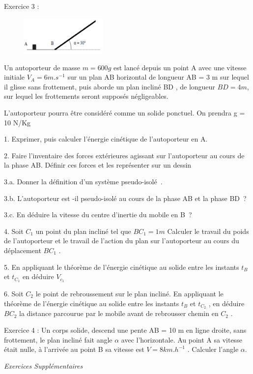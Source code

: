 \documentclass[12pt, french]{article}
\begin{document}
\begin{Box2}{Exercice 3 :}
\begin{figure}
  \begin{center}
    \includegraphics[width=0.38\textwidth]{./img/img00.png}
  \end{center}
\end{figure}
   Un autoporteur de masse $m = 600g$ est lancé depuis un point A avec une vitesse initiale $V_A = 6 m.s^{-1}$ sur un plan AB horizontal de longueur AB = 3 m sur lequel il glisse sans frottement, puis aborde un plan incliné BD , de
longueur $BD = 4 m$, sur lequel les frottements seront supposés négligeables.

L’autoporteur pourra être considéré comme un solide ponctuel. On prendra g = 10 N/Kg

1. Exprimer, puis calculer l’énergie cinétique de l’autoporteur en A.

2. Faire l’inventaire des forces extérieures agissant sur l’autoporteur au cours de la phase AB. Définir ces forces et les représenter sur un dessin

3.a. Donner la définition d’un système pseudo-isolé .

3.b. L’autoporteur est -il pseudo-isolé au cours de la phase AB et la phase BD ?

3.c. En déduire la vitesse du centre d’inertie du mobile en B ?

4. Soit $C_1$ un point du plan incliné tel que $BC_1 = 1 m$ Calculer le travail du poids de l’autoporteur et le travail de l’action du plan sur l’autoporteur au cours du
déplacement $BC_1$ .

   5. En appliquant le théorème de l’énergie cinétique au solide entre les instants $t_B$ et $t_{C_1}$ en déduire $V_{c_1}$

   6. Soit $C_2$ le point de rebroussement sur le plan incliné. En appliquant le théorème de l’énergie cinétique au solide entre les instants $t_B$ et $t_{C_2}$ , en déduire $BC_2$ la distance parcourue par le mobile avant de rebrousser chemin en $C_2$ .
\end{Box2}

\begin{Box2}{Exercice 4 : }
Un corps solide, descend une pente
AB = 10 m en ligne droite, sans frottement,
le plan incliné fait angle $\alpha$ avec l’horizontale.
Au point A sa vitesse était nulle, à l’arrivée au point B sa vitesse est $V= 8 km.h^{-1}$ .
Calculer l’angle $\alpha$.
\end{Box2}
\vspace{2cm}
\begin{center}
   \Large{ \em{Exercices Supplémentaires}}
\end{center}
\end{document}
